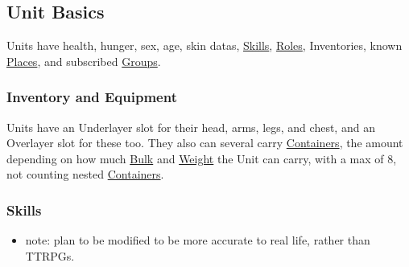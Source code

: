 \documentclass[11pt]{article}
\begin{document}
\subsection{Unit Basics}
\label{sec:org77e07ff}
Units have health, hunger, sex, age, skin datas, \hyperref[org58ad070]{Skills}, \hyperref[org080bb13]{Roles}, Inventories, known \hyperref[org6741c08]{Places}, and subscribed \hyperref[org21e4d88]{Groups}.\\
\subsubsection{Inventory and Equipment}
\label{sec:orgc8dabae}
Units have an Underlayer slot for their head, arms, legs, and chest, and an Overlayer slot for these too. They also can several carry \hyperref[org0f27c43]{Containers}, the amount depending on how much \hyperref[org7af52ad]{Bulk} and \hyperref[orgf5aa833]{Weight} the Unit can carry, with a max of 8, not counting nested \hyperref[org0f27c43]{Containers}.\\
\subsubsection{Skills \label{org58ad070} \label{org4617689}}
\label{sec:orgbafb52c}
\begin{itemize}
\item note: plan to be modified to be more accurate to real life, rather than TTRPGs.\\
\end{itemize}
\end{document}
